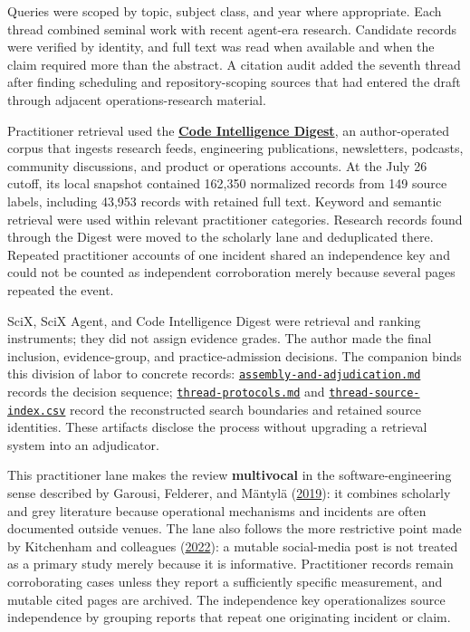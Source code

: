 Queries were scoped by topic, subject class, and year where appropriate. Each thread combined seminal work with recent agent-era research. Candidate records were verified by identity, and full text was read when available and when the claim required more than the abstract. A citation audit added the seventh thread after finding scheduling and repository-scoping sources that had entered the draft through adjacent operations-research material.

Practitioner retrieval used the \textbf{\href{https://www.sjarmak.ai/projects/code-intelligence-digest}{Code Intelligence Digest}}, an author-operated corpus that ingests research feeds, engineering publications, newsletters, podcasts, community discussions, and product or operations accounts. At the July 26 cutoff, its local snapshot contained 162,350 normalized records from 149 source labels, including 43,953 records with retained full text. Keyword and semantic retrieval were used within relevant practitioner categories. Research records found through the Digest were moved to the scholarly lane and deduplicated there. Repeated practitioner accounts of one incident shared an independence key and could not be counted as independent corroboration merely because several pages repeated the event.

SciX, SciX Agent, and Code Intelligence Digest were retrieval and ranking instruments; they did not assign evidence grades. The author made the final inclusion, evidence-group, and practice-admission decisions. The companion binds this division of labor to concrete records: \href{https://github.com/sjarmak/engineering-reliable-coding-agents/blob/main/companion/methodology/assembly-and-adjudication.md}{\texttt{assembly-and-adjudication.md}} records the decision sequence; \href{https://github.com/sjarmak/engineering-reliable-coding-agents/blob/main/companion/methodology/thread-protocols.md}{\texttt{thread-protocols.md}} and \href{https://github.com/sjarmak/engineering-reliable-coding-agents/blob/main/companion/methodology/thread-source-index.csv}{\texttt{thread-source-index.csv}} record the reconstructed search boundaries and retained source identities. These artifacts disclose the process without upgrading a retrieval system into an adjudicator.

This practitioner lane makes the review \textbf{multivocal} in the software-engineering sense described by Garousi, Felderer, and Mäntylä (\href{https://doi.org/10.1016/j.infsof.2018.09.006}{2019}): it combines scholarly and grey literature because operational mechanisms and incidents are often documented outside venues. The lane also follows the more restrictive point made by Kitchenham and colleagues (\href{https://doi.org/10.1109/TSE.2022.3165938}{2022}): a mutable social-media post is not treated as a primary study merely because it is informative. Practitioner records remain corroborating cases unless they report a sufficiently specific measurement, and mutable cited pages are archived. The independence key operationalizes source independence by grouping reports that repeat one originating incident or claim.

